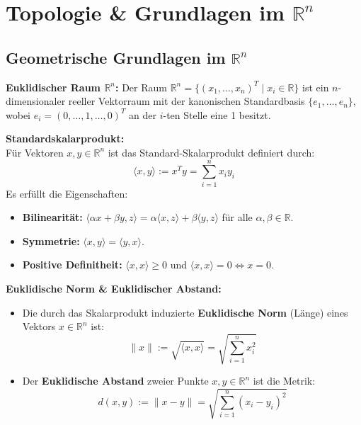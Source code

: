 \section{Topologie \& Grundlagen im $\mathbb{R}^n$}

\subsection{Geometrische Grundlagen im $\mathbb{R}^n$}

\begin{definition}
    \textbf{Euklidischer Raum $\mathbb{R}^n$:} Der Raum $\mathbb{R}^n = \{(x_1, \dots, x_n)^T \mid x_i \in \mathbb{R}\}$ ist ein $n$-dimensionaler reeller Vektorraum mit der kanonischen Standardbasis $\{e_1, \dots, e_n\}$, wobei $e_i = (0, \dots, 1, \dots, 0)^T$ an der $i$-ten Stelle eine 1 besitzt.
\end{definition}

\begin{definition}
    \textbf{Standardskalarprodukt:} \\
    Für Vektoren $x, y \in \mathbb{R}^n$ ist das Standard-Skalarprodukt definiert durch:
    $$ \langle x, y \rangle := x^T y = \sum_{i=1}^n x_i y_i $$
    Es erfüllt die Eigenschaften:
    \begin{itemize}
        \item \textbf{Bilinearität:} $\langle \alpha x + \beta y, z \rangle = \alpha \langle x, z \rangle + \beta \langle y, z \rangle$ für alle $\alpha, \beta \in \mathbb{R}$.
        \item \textbf{Symmetrie:} $\langle x, y \rangle = \langle y, x \rangle$.
        \item \textbf{Positive Definitheit:} $\langle x, x \rangle \ge 0$ und $\langle x, x \rangle = 0 \iff x = 0$.
    \end{itemize}
\end{definition}

\begin{definition}
    \textbf{Euklidische Norm \& Euklidischer Abstand:}
    \begin{itemize}
        \item Die durch das Skalarprodukt induzierte \textbf{Euklidische Norm} (Länge) eines Vektors $x \in \mathbb{R}^n$ ist:
        $$ \|x\| := \sqrt{\langle x, x \rangle} = \sqrt{\sum_{i=1}^n x_i^2} $$
        \item Der \textbf{Euklidische Abstand} zweier Punkte $x, y \in \mathbb{R}^n$ ist die Metrik:
        $$ d(x, y) := \|x - y\| = \sqrt{\sum_{i=1}^n (x_i - y_i)^2} $$
    \end{itemize}
\end{definition}

